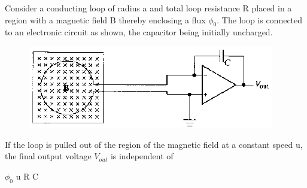 \documentclass{exam}
\begin{document}
\begin{questions}
\question Consider a conducting loop of radius a and total loop resistance R placed in a region with a magnetic field B thereby enclosing a flux $\phi_0$. The loop is connected to an electronic circuit as shown, the capacitor being initially uncharged.
	\begin{figure}[H]
	\centering
		\caption*{} \label{39} \caption*{} \label{} \includegraphics[width=0.8\columnwidth]{pics/39.png}
	\end{figure}
	If the loop is pulled out of the region of the magnetic field at a constant speed u, the final output voltage $V_{out}$ is independent of\hfill{}


\begin{oneparchoices}
	\choice $\phi_0$ \choice u \choice R \choice C
\end{oneparchoices}


\end{questions}
\end{document}
